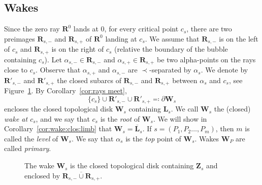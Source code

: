 \documentclass{amsart}
\newcommand{\1}{{\mathbb 1 }}
\newcommand\binfty{{\infty}}%
\newcommand{\bZ}{{\mathbf Z}}
\newcommand{\bL}{{\mathbf L}}
\newcommand{\bW}{{\mathbf W}}
\newcommand{\bR}{{\mathbf R}}
\theoremstyle{remark}
\numberwithin{equation}{section}
\theoremstyle{definition}
\theoremstyle{nonumberbreak}
\begin{document}
\subsection{Wakes}
\label{ss:wakes}
Since the zero ray $\bR^0$ lands at $0$, for every critical point $c_s$, there are two preimages $\bR_{s,-}$ and $\bR_{s,+}$ of $\bR^0$ landing at $c_s$. We assume that $\bR_{s,-}$ is on the left of $c_s$ and $\bR_{s,+}$ is on the right of $c_s$ (relative the boundary of the bubble containing $c_s$). Let $\alpha_{s,-}\in \bR_{s,-}$ and $\alpha_{s,+}\in \bR_{s,+}$ be two alpha-points on the rays close to $c_s$. Observe that $\alpha_{s,+}$ and  $\alpha_{s,-}$ are $\prec$-separated by $\alpha_s$. We denote by $\bR'_{s,-}$ and $\bR'_{s,+}$ the closed subarcs of $\bR_{s,-}$ and $\bR_{s,+}$ between $\alpha_s$ and $c_s$, see Figure~\ref{fig:wake:defn}. By Corollary~\ref{cor:rays meet},  
\begin{equation}
\label{eq:part Ws}
\{c_s\} \cup \bR'_{s,-}\cup \bR'_{s,+} \eqqcolon \partial \bW_s
\end{equation}
 encloses the closed topological disk $\bW_s$ containing $\bL_s$. We call $\bW_s$ the (closed) \emph{wake at $c_s$}, and we say that $c_s$ is the \emph{root} of $\bW_s$. We will show in Corollary~\ref{cor:wake:clos:limb} that $\bW_s=\overline \bL_s$. If $s=(P_1,P_2\dots, P_m)$, then $m$ is called the \emph{level} of $\bW_s$. We say that $\alpha_s$ is the \emph{top} point of $\bW_s$. Wakes $\bW_P$ are called \emph{primary}. 


\begin{figure}[tp!]
\caption{The wake $\bW_s$ is the closed topological disk containing $\bZ_s$ and enclosed by $\overline {\bR_{s,-}\cup \bR_{s,+}}$.}
\label{fig:wake:defn}
\end{figure}
\end{document}
